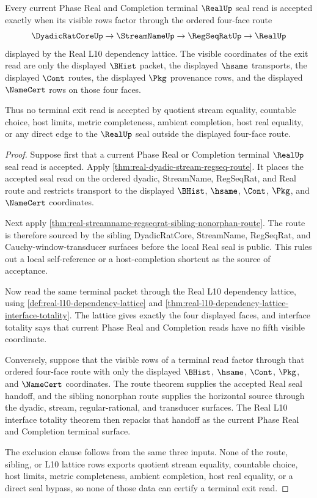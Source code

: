 \begin{theorem}
\label{thm:real-terminal-four-face-open-phase-exit}
Every current Phase Real and Completion terminal $\RealUp$ seal read is
accepted exactly when its visible rows factor through the ordered four-face
route
$$
\DyadicRatCoreUp \to \StreamNameUp \to \RegSeqRatUp \to \RealUp
$$
displayed by the Real L10 dependency lattice. The visible coordinates of the
exit read are only the displayed $\BHist$ packet, the displayed $\hsame$
transports, the displayed $\Cont$ routes, the displayed $\Pkg$ provenance
rows, and the displayed $\NameCert$ rows on those four faces.

Thus no terminal exit read is accepted by quotient stream equality, countable
choice, host limits, metric completeness, ambient completion, host real
equality, or any direct edge to the $\RealUp$ seal outside the displayed
four-face route.
\end{theorem}
\begin{proof}
Suppose first that a current Phase Real or Completion terminal $\RealUp$ seal
read is accepted. Apply \autoref{thm:real-dyadic-stream-regseq-route}. It
places the accepted seal read on the ordered dyadic, StreamName, RegSeqRat,
and Real route and restricts transport to the displayed $\BHist$, $\hsame$,
$\Cont$, $\Pkg$, and $\NameCert$ coordinates.

Next apply
\autoref{thm:real-streamname-regseqrat-sibling-nonorphan-route}. The route is
therefore sourced by the sibling DyadicRatCore, StreamName, RegSeqRat, and
Cauchy-window-transducer surfaces before the local Real seal is public. This
rules out a local self-reference or a host-completion shortcut as the source
of acceptance.

Now read the same terminal packet through the Real L10 dependency lattice,
using \autoref{def:real-l10-dependency-lattice} and
\autoref{thm:real-l10-dependency-lattice-interface-totality}. The lattice
gives exactly the four displayed faces, and interface totality says that
current Phase Real and Completion reads have no fifth visible coordinate.

Conversely, suppose that the visible rows of a terminal read factor through
that ordered four-face route with only the displayed $\BHist$, $\hsame$,
$\Cont$, $\Pkg$, and $\NameCert$ coordinates. The route theorem supplies the
accepted Real seal handoff, and the sibling nonorphan route supplies the
horizontal source through the dyadic, stream, regular-rational, and
transducer surfaces. The Real L10 interface totality theorem then repacks
that handoff as the current Phase Real and Completion terminal surface.

The exclusion clause follows from the same three inputs. None of the route,
sibling, or L10 lattice rows exports quotient stream equality, countable
choice, host limits, metric completeness, ambient completion, host real
equality, or a direct seal bypass, so none of those data can certify a
terminal exit read.
\end{proof}


